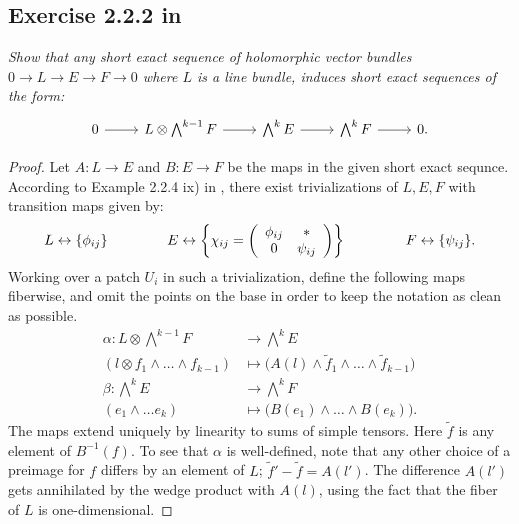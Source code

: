 \documentclass{article}
\begin{document}
\subsection*{Exercise 2.2.2 in \cite{Huy}}
\emph{Show that any short exact sequence of holomorphic vector bundles $0 \to L \to E \to F \to 0$ where
$L$ is a line bundle, induces short exact sequences of the form:}
\[
\begin{tikzcd}
0\arrow{r} & L\otimes \bigwedge^{k-1} F \arrow{r} & \bigwedge^{k} E\arrow{r} & \bigwedge^{k} F\arrow{r} & 0.
\end{tikzcd}
\]
\begin{proof}
Let $A : L \to E$ and $B:E \to F$ be the maps in the given short exact sequnce.
According to Example 2.2.4 ix) in \cite{Huy}, there exist trivializations of $L, E, F$ with transition maps
given by:
\[	
L \leftrightarrow \{\phi_{ij}\} \hspace{15mm} 
E\leftrightarrow 
\left\{\chi_{ij} =\left(\begin{array}{cc} \phi_{ij} & * \\ 0 & \psi_{ij} \end{array} \right) \right\} \hspace{15mm}
F \leftrightarrow \{\psi_{ij}\}. 	\]
Working over a patch $U_i$ in such a trivialization, define the following maps fiberwise, and omit the points
on the base in order to keep the notation as clean as possible.
\begin{align*}
\alpha: L \otimes \bigwedge^{k-1} F & \to \bigwedge^{k} E \\
(l\otimes f_1 \wedge \dots \wedge f_{k-1}) &\mapsto \big(A(l) \wedge \tilde f_1 \wedge \dots \wedge \tilde f_{k-1} \big) \\
\beta: \bigwedge^{k} E &\to \bigwedge^{k} F \\
(e_1 \wedge \dots e_k) &\mapsto \big(B(e_1) \wedge \dots \wedge B(e_k) \big).
\end{align*}
The maps extend uniquely by linearity to sums of simple tensors.
Here $\tilde f$ is any element of $B^{-1}(f)$. To see that $\alpha$ is well-defined, note that any other choice
of a preimage for $f$ differs by an element of $L$; $\tilde f' - \tilde f = A(l')$. The difference $A(l')$ gets
annihilated by the wedge product with $A(l)$, using the fact that the fiber of $L$ is one-dimensional.


\end{proof}
\end{document}
